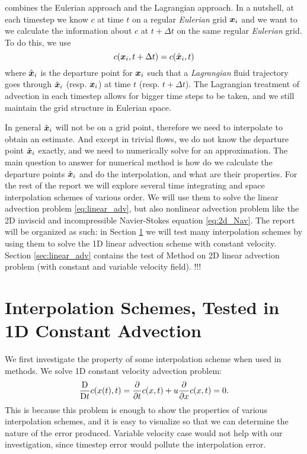 \documentclass[11pt,letterpaper]{article}
\begin{document}
\sml\;combines the Eulerian approach and the Lagrangian approach. In a nutshell, at each timestep we know $c$ at time $t$ on a regular \textit{Eulerian} grid $\boldsymbol{x}_i$ and we want to we calculate the information about $c$ at $t+\Delta t$ on the same regular \textit{Eulerian} grid. To do this, we use
$$c(\boldsymbol{x}_i,t+\Delta t) = c(\hat{\boldsymbol{x}}_i,t)$$
where $\hat{\boldsymbol{x}}_i$ is the departure point for $\boldsymbol{x}_i$ such that a \textit{Lagrangian} fluid trajectory goes through $\hat{\boldsymbol{x}}_i$ (resp. ${\boldsymbol{x}}_i$) at time $t$ (resp. $t+\Delta t$). The Lagrangian treatment of advection in each timestep allows for bigger time steps to be taken, and we still maintain the grid structure in Eulerian space. 

In general $\hat{\boldsymbol{x}}_i$ will not be on a grid point, therefore we need to interpolate to obtain an estimate. And except in trivial flows, we do not know the departure point $\hat{\boldsymbol{x}}_i$ exactly, and we need to numerically solve for an approximation. The main question to answer for \sml\;numerical method is how do we calculate the departure points $\hat{\boldsymbol{x}}_i$ and do the interpolation, and what are their properties. 
For the rest of the report we will explore several time integrating and space interpolation schemes of various order. We will use them to solve the linear advection problem \eqref{eq:linear_adv}, but also nonlinear advection problem like the 2D inviscid and incompressible Navier-Stokes equation \eqref{eq:2d_Nav}. The report will be organized as such: in Section \ref{sec:interp1D} we will test many interpolation schemes by using them to solve the 1D linear advection scheme with constant velocity. Section \ref{sec:linear_adv} contains the test of \sml\;Method on 2D linear advection problem (with constant and variable velocity field). !!!

\section{Interpolation Schemes, Tested in 1D Constant Advection}\label{sec:interp1D}
We first investigate the property of some interpolation scheme when used in \sml\;methods. We solve 1D constant velocity advection problem: 
\begin{align*}
        \frac{\mathrm{D}}{\mathrm{D} t}c(x(t),t) = \frac{\partial}{\partial t}c(x,t)+ u \frac{\partial}{\partial x}c(x,t) = 0.
\end{align*}
This is because this problem is enough to show the properties of various interpolation schemes, and it is easy to visualize so that we can determine the nature of the error produced. Variable velocity case would not help with our investigation, since timestep error would pollute the interpolation error. %
\end{document}
